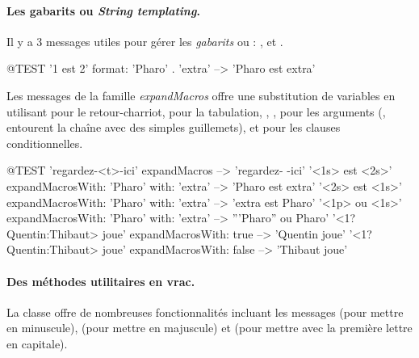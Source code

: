 \documentclass[a4paper,10pt,twoside]{book}
\begin{document}

\paragraph{Les gabarits ou \emph{String templating}.}
Il y a 3 messages utiles pour gérer les \emph{gabarits} ou : ,  et .

\begin{code}{@TEST}
'{1} est {2}' format: {'Pharo' . 'extra'}  --> 'Pharo est extra'
\end{code} %

Les messages de la famille \emph{expandMacros} offre une substitution
de variables en utilisant  pour le retour-charriot,  
pour la tabulation, , ,  pour les arguments
(,  entourent la chaîne avec des simples guillemets),
et  pour les clauses conditionnelles.


\begin{code}{@TEST}
'regardez-<t>-ici' expandMacros                                         --> 'regardez-	-ici'
'<1s> est <2s>' expandMacrosWith: 'Pharo' with: 'extra'   --> 'Pharo est extra'
'<2s> est <1s>' expandMacrosWith: 'Pharo' with: 'extra'   --> 'extra est Pharo'
'<1p> ou <1s>' expandMacrosWith: 'Pharo' with: 'extra'  --> '''Pharo'' ou Pharo'
'<1?Quentin:Thibaut> joue' expandMacrosWith: true     --> 'Quentin joue'
'<1?Quentin:Thibaut> joue' expandMacrosWith: false    --> 'Thibaut joue'
\end{code}

\paragraph{Des méthodes utilitaires en vrac.}
La classe  offre de nombreuses fonctionnalités incluant les 
messages  (pour mettre en minuscule),  (pour mettre en majuscule) et  (pour mettre avec la première lettre en capitale). 
\end{document}
